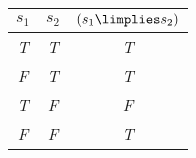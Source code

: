 \begin{tabular}{c c||c}
$s_1$  & $s_2$ & $(s_1 \limplies s_2)$\\
\hline
\emph{T} & \emph{T} & \emph{T} \\
\emph{F} & \emph{T} & \emph{T} \\
\emph{T} & \emph{F} & \emph{F}  \\
\emph{F} & \emph{F} & \emph{T} \\
\end{tabular}

